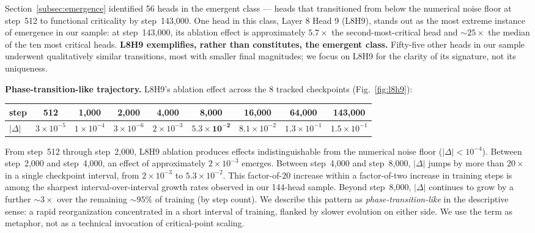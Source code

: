 \documentclass{article}
\begin{document}
Section~\ref{subsec:emergence} identified 56 heads in the emergent class --- heads that transitioned from below the numerical noise floor at step~512 to functional criticality by step~143,000. One head in this class, Layer 8 Head 9 (L8H9), stands out as the most extreme instance of emergence in our sample: at step~143,000, its ablation effect is approximately $5.7\times$ the second-most-critical head and $\sim\!25\times$ the median of the ten most critical heads. \textbf{L8H9 exemplifies, rather than constitutes, the emergent class.} Fifty-five other heads in our sample underwent qualitatively similar transitions, most with smaller final magnitudes; we focus on L8H9 for the clarity of its signature, not its uniqueness.

\textbf{Phase-transition-like trajectory.} L8H9's ablation effect across the 8 tracked checkpoints (Fig.~\ref{fig:l8h9}):

\begin{center}
\begin{tabular}{lcccccccc}
\toprule
step & 512 & 1{,}000 & 2{,}000 & 4{,}000 & 8{,}000 & 16{,}000 & 64{,}000 & 143{,}000 \\
\midrule
$|\Delta|$ & $3{\times}10^{-5}$ & $1{\times}10^{-4}$ & $3{\times}10^{-6}$ & $2{\times}10^{-3}$ & $\mathbf{5.3{\times}10^{-2}}$ & $8.1{\times}10^{-2}$ & $1.3{\times}10^{-1}$ & $1.5{\times}10^{-1}$ \\
\bottomrule
\end{tabular}
\end{center}

From step~512 through step~2,000, L8H9 ablation produces effects indistinguishable from the numerical noise floor ($|\Delta| < 10^{-4}$). Between step~2,000 and step~4,000, an effect of approximately $2 \times 10^{-3}$ emerges. Between step~4,000 and step~8,000, $|\Delta|$ jumps by more than $20\times$ in a single checkpoint interval, from $2 \times 10^{-3}$ to $5.3 \times 10^{-2}$. This factor-of-$20$ increase within a factor-of-two increase in training steps is among the sharpest interval-over-interval growth rates observed in our 144-head sample. Beyond step~8,000, $|\Delta|$ continues to grow by a further $\sim\!3\times$ over the remaining $\sim\!95\%$ of training (by step count). We describe this pattern as \emph{phase-transition-like} in the descriptive sense: a rapid reorganization concentrated in a short interval of training, flanked by slower evolution on either side. We use the term as metaphor, not as a technical invocation of critical-point scaling.
\end{document}
